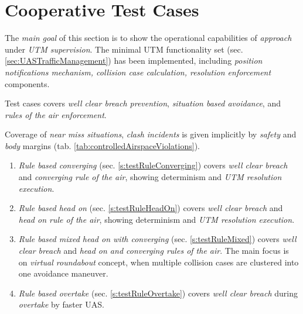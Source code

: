 \cleardoublepage
\section{Cooperative Test Cases}\label{s:cooperativeTestCases}
    
    \noindent The \emph{main goal} of this section is to show the operational capabilities of \emph{approach} under \emph{UTM supervision}. The minimal UTM functionality set (sec. \ref{sec:UASTrafficManagement}) has been implemented, including \emph{position notifications mechanism, collision case calculation, resolution enforcement} components. 
    
    Test cases covers \emph{well clear breach prevention}, \emph{situation based avoidance}, and \emph{rules of the air enforcement}. 
    
    Coverage of \emph{near miss situations}, \emph{clash incidents} is given implicitly by \emph{safety} and \emph{body} margins (tab. \ref{tab:controlledAirspaceViolations}).
    
    \begin{enumerate}
        \item \emph{Rule based converging} (sec. \ref{s:testRuleConverging}) covers \emph{well clear breach} and \emph{converging rule of the air}, showing determinism and \emph{UTM resolution execution}.
        
        \item \emph{Rule based head on} (sec. \ref{s:testRuleHeadOn}) covers \emph{well clear breach} and \emph{head on rule of the air}, showing determinism and \emph{UTM resolution execution}.
        
        \item \emph{Rule based mixed head on with converging} (sec. \ref{s:testRuleMixed}) covers \emph{well clear breach} and \emph{head on and converging rules of the air}. The main focus is on \emph{virtual roundabout} concept, when multiple collision cases are clustered into one avoidance maneuver. 
        
        \item \emph{Rule based overtake} (sec. \ref{s:testRuleOvertake}) covers \emph{well clear breach} during \emph{overtake} by faster UAS.
    \end{enumerate}

